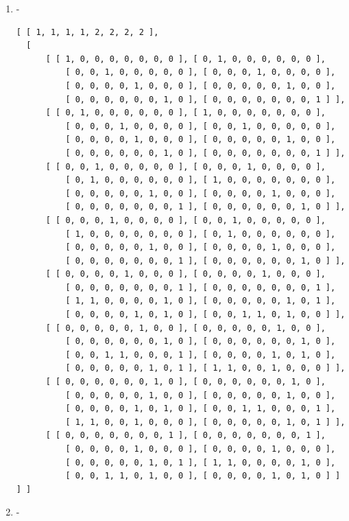 \documentclass[a4paper, 10pt]{book}
\theoremstyle{definition}
\numberwithin{equation}{chapter}
\begin{document}
\begin{appendices}
\begin{enumerate}
\begin{lstlisting}[numbers=none]
          [ 0, 0, 0, 0, 0, 1, 0, 1 ], [ 1, 1, 0, 0, 0, 0, 1, 0 ], 
          [ 0, 0, 1, 1, 0, 1, 0, 0 ], [ 0, 0, 0, 0, 1, 0, 1, 0 ] ] ] ]
	\end{lstlisting}
	\item -\begin{lstlisting}[numbers=none]
	[ [ 1, 1, 1, 1, 2, 2, 2, 2 ], 
  [ 
      [ [ 1, 0, 0, 0, 0, 0, 0, 0 ], [ 0, 1, 0, 0, 0, 0, 0, 0 ], 
          [ 0, 0, 1, 0, 0, 0, 0, 0 ], [ 0, 0, 0, 1, 0, 0, 0, 0 ], 
          [ 0, 0, 0, 0, 1, 0, 0, 0 ], [ 0, 0, 0, 0, 0, 1, 0, 0 ], 
          [ 0, 0, 0, 0, 0, 0, 1, 0 ], [ 0, 0, 0, 0, 0, 0, 0, 1 ] ], 
      [ [ 0, 1, 0, 0, 0, 0, 0, 0 ], [ 1, 0, 0, 0, 0, 0, 0, 0 ], 
          [ 0, 0, 0, 1, 0, 0, 0, 0 ], [ 0, 0, 1, 0, 0, 0, 0, 0 ], 
          [ 0, 0, 0, 0, 1, 0, 0, 0 ], [ 0, 0, 0, 0, 0, 1, 0, 0 ], 
          [ 0, 0, 0, 0, 0, 0, 1, 0 ], [ 0, 0, 0, 0, 0, 0, 0, 1 ] ], 
      [ [ 0, 0, 1, 0, 0, 0, 0, 0 ], [ 0, 0, 0, 1, 0, 0, 0, 0 ], 
          [ 0, 1, 0, 0, 0, 0, 0, 0 ], [ 1, 0, 0, 0, 0, 0, 0, 0 ], 
          [ 0, 0, 0, 0, 0, 1, 0, 0 ], [ 0, 0, 0, 0, 1, 0, 0, 0 ], 
          [ 0, 0, 0, 0, 0, 0, 0, 1 ], [ 0, 0, 0, 0, 0, 0, 1, 0 ] ], 
      [ [ 0, 0, 0, 1, 0, 0, 0, 0 ], [ 0, 0, 1, 0, 0, 0, 0, 0 ], 
          [ 1, 0, 0, 0, 0, 0, 0, 0 ], [ 0, 1, 0, 0, 0, 0, 0, 0 ], 
          [ 0, 0, 0, 0, 0, 1, 0, 0 ], [ 0, 0, 0, 0, 1, 0, 0, 0 ], 
          [ 0, 0, 0, 0, 0, 0, 0, 1 ], [ 0, 0, 0, 0, 0, 0, 1, 0 ] ], 
      [ [ 0, 0, 0, 0, 1, 0, 0, 0 ], [ 0, 0, 0, 0, 1, 0, 0, 0 ], 
          [ 0, 0, 0, 0, 0, 0, 0, 1 ], [ 0, 0, 0, 0, 0, 0, 0, 1 ], 
          [ 1, 1, 0, 0, 0, 0, 1, 0 ], [ 0, 0, 0, 0, 0, 1, 0, 1 ], 
          [ 0, 0, 0, 0, 1, 0, 1, 0 ], [ 0, 0, 1, 1, 0, 1, 0, 0 ] ], 
      [ [ 0, 0, 0, 0, 0, 1, 0, 0 ], [ 0, 0, 0, 0, 0, 1, 0, 0 ], 
          [ 0, 0, 0, 0, 0, 0, 1, 0 ], [ 0, 0, 0, 0, 0, 0, 1, 0 ], 
          [ 0, 0, 1, 1, 0, 0, 0, 1 ], [ 0, 0, 0, 0, 1, 0, 1, 0 ], 
          [ 0, 0, 0, 0, 0, 1, 0, 1 ], [ 1, 1, 0, 0, 1, 0, 0, 0 ] ], 
      [ [ 0, 0, 0, 0, 0, 0, 1, 0 ], [ 0, 0, 0, 0, 0, 0, 1, 0 ], 
          [ 0, 0, 0, 0, 0, 1, 0, 0 ], [ 0, 0, 0, 0, 0, 1, 0, 0 ], 
          [ 0, 0, 0, 0, 1, 0, 1, 0 ], [ 0, 0, 1, 1, 0, 0, 0, 1 ], 
          [ 1, 1, 0, 0, 1, 0, 0, 0 ], [ 0, 0, 0, 0, 0, 1, 0, 1 ] ], 
      [ [ 0, 0, 0, 0, 0, 0, 0, 1 ], [ 0, 0, 0, 0, 0, 0, 0, 1 ], 
          [ 0, 0, 0, 0, 1, 0, 0, 0 ], [ 0, 0, 0, 0, 1, 0, 0, 0 ], 
          [ 0, 0, 0, 0, 0, 1, 0, 1 ], [ 1, 1, 0, 0, 0, 0, 1, 0 ], 
          [ 0, 0, 1, 1, 0, 1, 0, 0 ], [ 0, 0, 0, 0, 1, 0, 1, 0 ] ] ] ]
	\end{lstlisting}
	\item -\begin{lstlisting}[numbers=none]

\end{lstlisting}
\end{enumerate}
\end{appendices}
\end{document}
